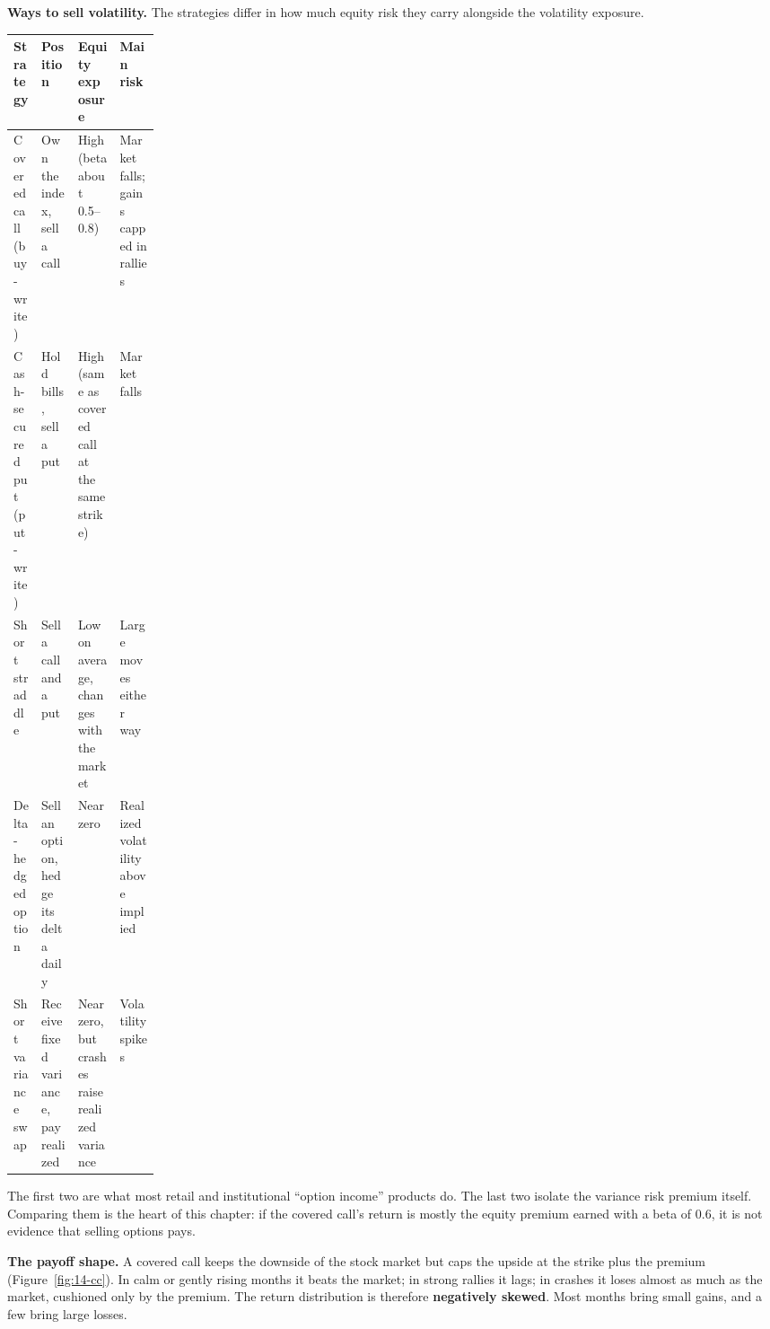 \textbf{Ways to sell volatility.} The strategies differ in how much equity risk they carry alongside the volatility exposure.

\begin{center}
\small
\begin{tabularx}{0.9\linewidth}{@{}>{\raggedright\arraybackslash}p{0.19\linewidth}>{\raggedright\arraybackslash}X>{\raggedright\arraybackslash}X>{\raggedright\arraybackslash}X@{}}
\toprule
Strategy & Position & Equity exposure & Main risk \\
\midrule
Covered call (buy-write) & Own the index, sell a call & High (beta about 0.5--0.8) & Market falls; gains capped in rallies \\
Cash-secured put (put-write) & Hold bills, sell a put & High (same as covered call at the same strike) & Market falls \\
Short straddle & Sell a call and a put & Low on average, changes with the market & Large moves either way \\
Delta-hedged option & Sell an option, hedge its delta daily & Near zero & Realized volatility above implied \\
Short variance swap & Receive fixed variance, pay realized & Near zero, but crashes raise realized variance & Volatility spikes \\
\bottomrule
\end{tabularx}
\end{center}

The first two are what most retail and institutional ``option income'' products do. The last two isolate the variance risk premium itself. Comparing them is the heart of this chapter: if the covered call's return is mostly the equity premium earned with a beta of 0.6, it is not evidence that selling options pays.

\textbf{The payoff shape.} A covered call keeps the downside of the stock market but caps the upside at the strike plus the premium (Figure~\ref{fig:14-cc}). In calm or gently rising months it beats the market; in strong rallies it lags; in crashes it loses almost as much as the market, cushioned only by the premium. The return distribution is therefore \textbf{negatively skewed}. Most months bring small gains, and a few bring large losses.

